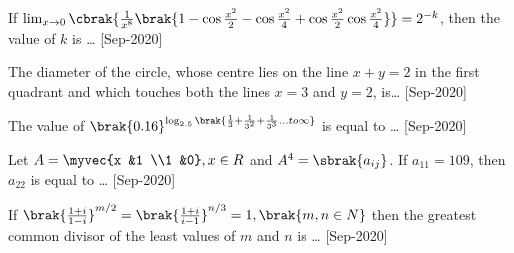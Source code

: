 \iffalse
    \title{2020}
    \author{EE24BTECH11021}
    \section{integer}
\fi
  \item If $\lim_{x \to 0} \cbrak{\frac{1}{x^8}\brak{1-\cos{\frac{x^2}{2}}-\cos{\frac{x^2}{4}}+\cos{\frac{x^2}{2}}\cos{\frac{x^2}{4}}}}=2^{-k}$, then the value of $k$ is \dots 
    \hfill{[Sep-2020]}
    \item The diameter of the circle, whose centre lies on the line $x + y = 2$ in the first quadrant and which touches both the lines $x=3$ and $y=2$, is\dots
    \hfill{[Sep-2020]}
    \item The value of $\brak{0.16}^{\log_{2.5}\brak{\frac{1}{3}+\frac{1}{3^2}+\frac{1}{3^3}\dots to \infty}}$ is equal to \dots 
    \hfill{[Sep-2020]}
    \item Let $A=\myvec{x &1 \\1 &0},x\in R$ and $A^4=\sbrak{a_{ij}}$. If $a_{11}=109$, then $a_{22}$ is equal to \dots
    \hfill{[Sep-2020]}
    \item If $\brak{\frac{1+i}{1-i}}^{m/2}=\brak{\frac{1+i}{i-1}}^{n/3}=1,\brak{m,n\in N}$ then the greatest common divisor of the least values of $m$ and $n$ is \dots
    \hfill{[Sep-2020]}
